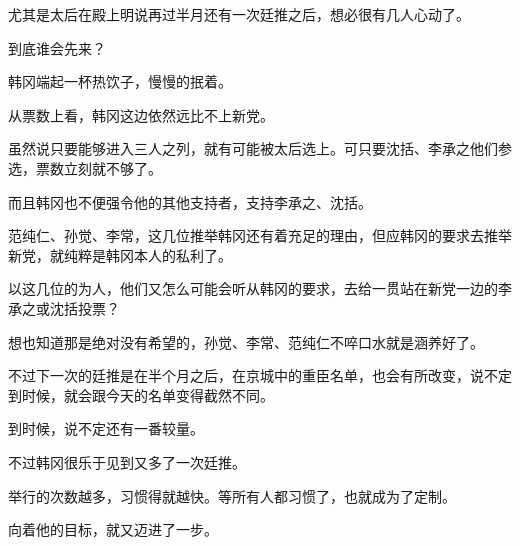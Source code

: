 尤其是太后在殿上明说再过半月还有一次廷推之后，想必很有几人心动了。

到底谁会先来？

韩冈端起一杯热饮子，慢慢的抿着。

从票数上看，韩冈这边依然远比不上新党。

虽然说只要能够进入三人之列，就有可能被太后选上。可只要沈括、李承之他们参选，票数立刻就不够了。

而且韩冈也不便强令他的其他支持者，支持李承之、沈括。

范纯仁、孙觉、李常，这几位推举韩冈还有着充足的理由，但应韩冈的要求去推举新党，就纯粹是韩冈本人的私利了。

以这几位的为人，他们又怎么可能会听从韩冈的要求，去给一贯站在新党一边的李承之或沈括投票？

想也知道那是绝对没有希望的，孙觉、李常、范纯仁不啐口水就是涵养好了。

不过下一次的廷推是在半个月之后，在京城中的重臣名单，也会有所改变，说不定到时候，就会跟今天的名单变得截然不同。

到时候，说不定还有一番较量。

不过韩冈很乐于见到又多了一次廷推。

举行的次数越多，习惯得就越快。等所有人都习惯了，也就成为了定制。

向着他的目标，就又迈进了一步。

